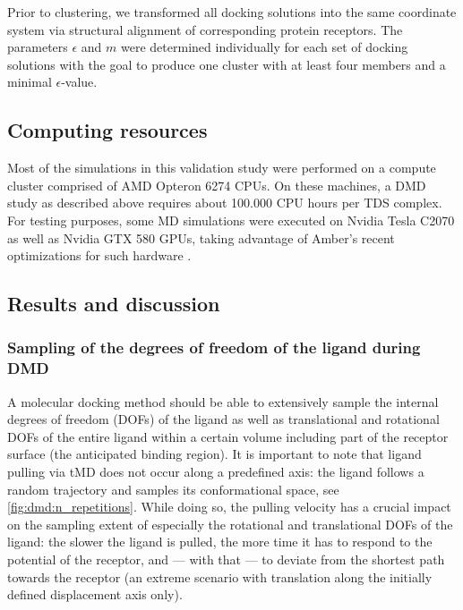 Prior to clustering, we transformed all docking solutions into the same
coordinate system via structural alignment of corresponding protein receptors.
The parameters $\epsilon$ and $m$ were determined individually for each set of
docking solutions with the goal to produce one cluster with at least four
members and a minimal $\epsilon$-value.


\subsection{Computing resources}

Most of the simulations in this validation study were performed on a compute
cluster comprised of AMD Opteron 6274 CPUs. On these machines, a DMD study as
described above requires about 100.000 CPU hours per TDS complex. For testing
purposes, some MD simulations were executed on Nvidia Tesla C2070 as well as
Nvidia GTX 580 GPUs, taking advantage of Amber's recent optimizations for such
hardware \cite{amber_gpu_2012}.


\subsection{Results and discussion}

\subsubsection{Sampling of the degrees of freedom of the ligand during DMD}

A molecular docking method should be able to extensively sample the internal
degrees of freedom (DOFs) of the ligand as well as translational and rotational
DOFs of the entire ligand within a certain volume including part of the receptor
surface (the anticipated binding region). It is important to note that ligand
pulling via tMD does not occur along a predefined axis: the ligand follows a
random trajectory and samples its conformational space, see
\cref{fig:dmd:n_repetitions}. While doing so, the pulling velocity has a crucial
impact on the sampling extent of especially the rotational and translational
DOFs of the ligand: the slower the ligand is pulled, the more time it has to
respond to the potential of the receptor, and --- with that --- to deviate from
the shortest path towards the receptor (an extreme scenario with translation
along the initially defined displacement axis only).

